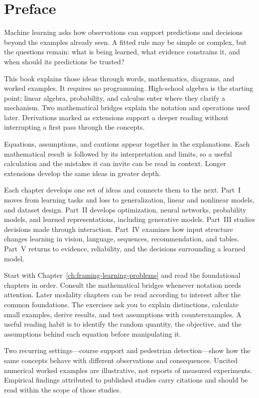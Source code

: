 \chapter*{Preface}

Machine learning asks how observations can support predictions and decisions beyond the examples already seen. A fitted rule may be simple or complex, but the questions remain: what is being learned, what evidence constrains it, and when should its predictions be trusted?

This book explains those ideas through words, mathematics, diagrams, and worked examples. It requires no programming. High-school algebra is the starting point; linear algebra, probability, and calculus enter where they clarify a mechanism. Two mathematical bridges explain the notation and operations used later. Derivations marked as extensions support a deeper reading without interrupting a first pass through the concepts.

Equations, assumptions, and cautions appear together in the explanations. Each mathematical result is followed by its interpretation and limits, so a useful calculation and the mistakes it can invite can be read in context. Longer extensions develop the same ideas in greater depth.

Each chapter develops one set of ideas and connects them to the next. Part~I moves from learning tasks and loss to generalization, linear and nonlinear models, and dataset design. Part~II develops optimization, neural networks, probability models, and learned representations, including generative models. Part~III studies decisions made through interaction. Part~IV examines how input structure changes learning in vision, language, sequences, recommendation, and tables. Part~V returns to evidence, reliability, and the decisions surrounding a learned model.

Start with Chapter~\ref{ch:framing-learning-problems} and read the foundational chapters in order. Consult the mathematical bridges whenever notation needs attention. Later modality chapters can be read according to interest after the common foundations. The exercises ask you to explain distinctions, calculate small examples, derive results, and test assumptions with counterexamples. A useful reading habit is to identify the random quantity, the objective, and the assumptions behind each equation before manipulating it.

Two recurring settings---course support and pedestrian detection---show how the same concepts behave with different observations and consequences. Uncited numerical worked examples are illustrative, not reports of measured experiments. Empirical findings attributed to published studies carry citations and should be read within the scope of those studies.

